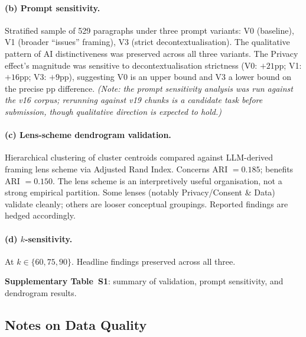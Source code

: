 \documentclass[11pt, a4paper]{article}
\begin{document}
\paragraph{(b) Prompt sensitivity.}  Stratified sample of 529 paragraphs
under three prompt variants: V0 (baseline), V1 (broader ``issues''
framing), V3 (strict decontextualisation).  The qualitative pattern of AI
distinctiveness was preserved across all three variants.  The Privacy
effect's magnitude was sensitive to decontextualisation strictness (V0:
$+21$pp; V1: $+16$pp; V3: $+9$pp), suggesting V0 is an upper bound and
V3 a lower bound on the precise pp difference.  \emph{(Note: the prompt
sensitivity analysis was run against the v16 corpus; rerunning against
v19 chunks is a candidate task before submission, though qualitative
direction is expected to hold.)}

\paragraph{(c) Lens-scheme dendrogram validation.}  Hierarchical
clustering of cluster centroids compared against LLM-derived framing lens
scheme via Adjusted Rand Index.  Concerns ARI $= 0.185$; benefits ARI
$= 0.150$.  The lens scheme is an interpretively useful organisation, not
a strong empirical partition.  Some lenses (notably Privacy/Consent \&
Data) validate cleanly; others are looser conceptual groupings.  Reported
findings are hedged accordingly.

\paragraph{(d) $k$-sensitivity.}  At $k \in \{60, 75, 90\}$.  Headline
findings preserved across all three.

\noindent\textbf{Supplementary Table~S1}: summary of validation, prompt
sensitivity, and dendrogram results.

\subsection{Notes on Data Quality}
\end{document}
